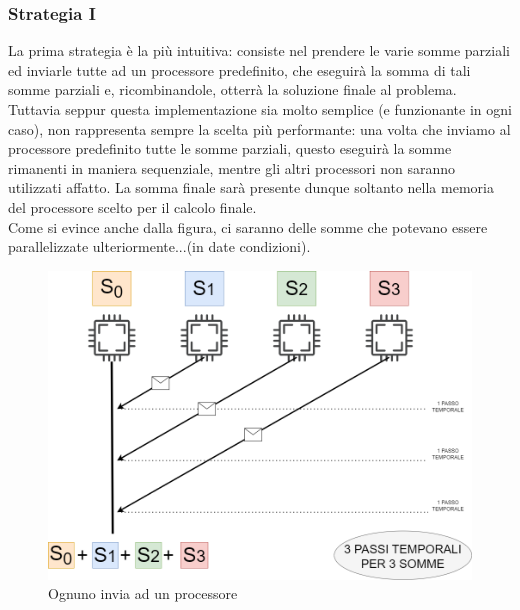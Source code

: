 \documentclass{article}
\begin{document}
\subsubsection{Strategia I}
    La prima strategia è la più intuitiva: consiste nel prendere le varie somme parziali ed inviarle tutte ad un processore predefinito, che eseguirà la somma di tali somme parziali e, ricombinandole, otterrà la soluzione finale al problema.
    Tuttavia seppur questa implementazione sia molto semplice (e funzionante in ogni caso), non rappresenta sempre la scelta più performante: una volta che inviamo al processore predefinito tutte le somme parziali, questo eseguirà la somme rimanenti in maniera sequenziale, mentre gli altri processori non saranno utilizzati affatto. La somma finale sarà presente dunque soltanto nella memoria del processore scelto per il calcolo finale.\\
    Come si evince anche dalla figura, ci saranno delle somme che potevano essere parallelizzate ulteriormente...(in date condizioni). 

    \begin{figure}
        \centering
        \includegraphics[width=1\linewidth]{strategia_I.drawio.png}
        \caption{Ognuno invia ad un processore}
        \label{fig:enter-label}
    \end{figure}
\end{document}

